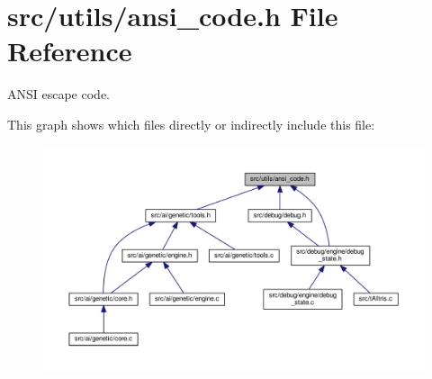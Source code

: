 \section{src/utils/ansi\+\_\+code.h File Reference}
\label{ansi__code_8h}


A\+N\+SI escape code.  


This graph shows which files directly or indirectly include this file\+:
\nopagebreak
\begin{figure}[H]
\begin{center}
\leavevmode
\includegraphics[width=350pt]{ansi__code_8h__dep__incl}
\end{center}
\end{figure}
